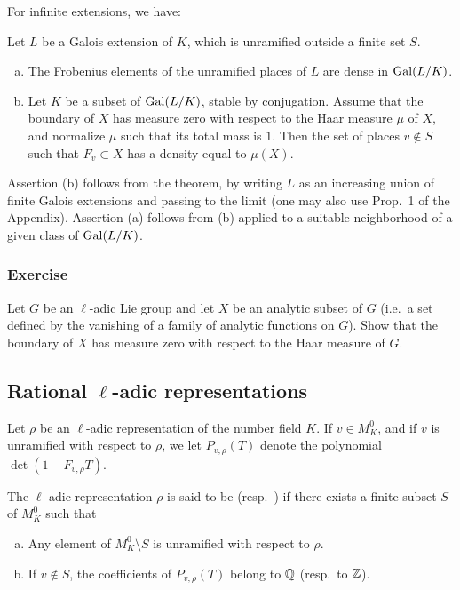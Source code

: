 For infinite extensions, we have:
\begin{cor}
Let $L$ be a Galois extension of $K$, which is unramified outside a finite set
$S$.
\begin{enumerate}[a)]
\item The Frobenius elements of the unramified places of $L$ are dense in
	$\operatorname{Gal}(L/K)$.
\item Let $K$ be a subset of $\operatorname{Gal}(L/K)$, stable by conjugation. Assume that
	the boundary of $X$ has measure zero with respect to the Haar measure
	$\mu$ of $X$, and normalize $\mu$ such that its total mass is $1$. Then
	the set of places $v \not\in S$ such that $F_v \subset X$ has a density
	equal to $\mu(X)$.
\end{enumerate}
\end{cor}

Assertion (b) follows from the theorem, by writing $L$ as an increasing union
of finite Galois extensions and passing to the limit (one may also use Prop.~1
of the Appendix). Assertion (a) follows from (b) applied to a suitable
neighborhood of a given class of $\operatorname{Gal}(L/K)$.

\subsubsection*{Exercise}
Let $G$ be an $\ell$-adic Lie group and let $X$ be an analytic subset of $G$
(i.e.\ a set defined by the vanishing of a family of analytic functions on $G$).
Show that the boundary of $X$ has measure zero
\dpage
with respect to the Haar measure of $G$.

\subsection{Rational \texorpdfstring{$\ell$}{ℓ}-adic representations}
\label{sec:I_23}
Let $\rho$ be an $\ell$-adic representation of the number field $K$. If $v \in
M_K^0$, and if $v$ is unramified with respect to $\rho$, we let $P_{v,\rho}(T)$
denote the polynomial $\det(1 - F_{v,\rho} T)$.

\begin{mydef}
The $\ell$-adic representation $\rho$ is said to be
 (resp.\ 
) if there exists a finite
subset $S$ of $M_K^0$ such that
\begin{enumerate}[(a)]
	\item Any element of $M_K^0 \setminus S$ is unramified with respect to 
	$\rho$.
	\item If $v \not\in S$, the coefficients of $P_{v,\rho}(T)$ belong to
		$\mathbb{Q}$ (resp.\ to $\mathbb{Z}$).
\end{enumerate}
\end{mydef}

